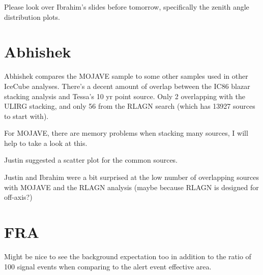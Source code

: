 Please look over Ibrahim's slides before tomorrow, specifically the zenith angle distribution plots. 

\section{Abhishek}
Abhishek compares the MOJAVE sample to some other samples used in other IceCube analyses. There's a decent amount of overlap between the IC86 blazar stacking analysis and Tessa's 10 yr point source. Only 2 overlapping with the ULIRG stacking, and only 56 from the RLAGN search (which has 13927 sources to start with).

For MOJAVE, there are memory problems when stacking many sources, I will help to take a look at this. 

Justin suggested a scatter plot for the common sources.

Justin and Ibrahim were a bit surprised at the low number of overlapping sources with MOJAVE and the RLAGN analysis (maybe because RLAGN is designed for off-axis?) 


\section{FRA}
Might be nice to see the background expectation too in addition to the ratio of 100 signal events when comparing to the alert event effective area. 
